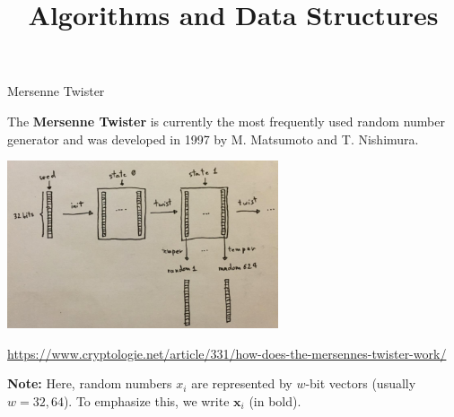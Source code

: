 \documentclass[11pt,compress,t,notes=noshow, xcolor=table]{beamer}
\title{Algorithms and Data Structures}
\begin{document}


\begin{vbframe}{Mersenne Twister}

The \textbf{Mersenne Twister} is currently the most frequently used random number generator and was developed in 1997 by M. Matsumoto and T. Nishimura.

\begin{center}
\includegraphics[width = 0.6\textwidth]{figure_man/mersenne.png} \\
\begin{footnotesize}
\url{https://www.cryptologie.net/article/331/how-does-the-mersennes-twister-work/}
\end{footnotesize}
\end{center}


\framebreak

\begin{small}
	\textbf{Note:} Here, random numbers $x_i$ are represented by $w$-bit vectors (usually $w = 32, 64$). To emphasize this, we write $\mathbf{x}_i$ (in bold).
\end{small}

\vspace*{0.2cm}


\end{vbframe}
\end{document}
